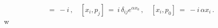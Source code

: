 \begin{equation}[ x_0 , p_0 ] \ = \ -i\,
,\quad [ x_i , p_j ] \ = \ i\,\delta_{i j} e^{\alpha x_0}\, ,\quad
[ x_i , p_0 ] \ = \ -i\,\alpha x_i\,
.\label{r322}\end{equation}w

